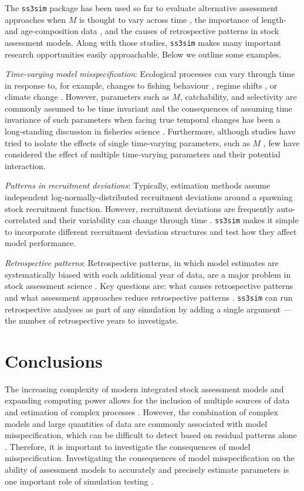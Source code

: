 \documentclass[12pt]{article}
\begin{document}
The \texttt{ss3sim} package has been used so far to evaluate alternative assessment approaches when $M$ is thought to vary across time \cite{johnson2013}, the importance of length- and age-composition data \cite{ono2013}, and the causes of retrospective patterns in stock assessment models. Along with those studies, \texttt{ss3sim} makes many important research opportunities easily approachable. Below we outline some examples.

\emph{Time-varying model misspecification}: Ecological processes can vary through time in response to, for example, changes to fishing behaviour \cite{hilborn1992}, regime shifts \cite{vert-pre2013}, or climate change \cite{walther2002}. However, parameters such as $M$, catchability, and selectivity are commonly assumed to be time invariant and the consequences of assuming time invariance of such parameters when facing true temporal changes has been a long-standing discussion in fisheries science \cite{royama1992, wilberg2006, fu2001}. Furthermore, although studies have tried to isolate the effects of single time-varying parameters, such as $M$ \cite{lee2011, jiao2012, deroba2013, johnson2013}, few have considered the effect of multiple time-varying parameters and their potential interaction.

\emph{Patterns in recruitment deviations}: Typically, estimation methods assume independent log-normally-distributed recruitment deviations around a spawning stock recruitment function. However, recruitment deviations are frequently auto-correlated and their variability can change through time \cite{beamish1995, pyper1998}. \texttt{ss3sim} makes it simple to incorporate different recruitment deviation structures and test how they affect model performance.

\emph{Retrospective patterns}: Retrospective patterns, in which model estimates are systematically biased with each additional year of data, are a major problem in stock assessment science \cite{mohn1999, legault2008}. Key questions are: what causes retrospective patterns and what assessment approaches reduce retrospective patterns \cite{legault2008}. \texttt{ss3sim} can run retrospective analyses as part of any simulation by adding a single argument --- the number of retrospective years to investigate.

\section*{Conclusions}

The increasing complexity of modern integrated stock assessment models and expanding computing power allows for the inclusion of multiple sources of data and estimation of complex processes \cite{maunder2013}. However, the combination of complex models and large quantities of data are commonly associated with model misspecification, which can be difficult to detect based on residual patterns alone \cite{maunder2013}. Therefore, it is important to investigate the consequences of model misspecification. Investigating the consequences of model misspecification on the ability of assessment models to accurately and precisely estimate parameters is one important role of simulation testing \cite{wilberg2006, deroba2013a, crone2013}.
\end{document}
